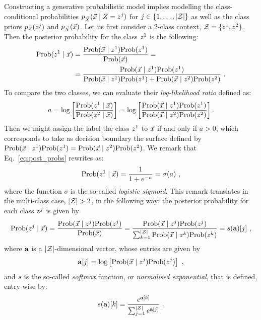 Constructing a generative probabilistic model implies modelling the class-conditional probabilities $\pdf_{\vaLeakVec}(\given{\vLeakVec}{\sensRandVar = \sensVar^j})$ for $j\in \{1,\dots,\lvert\mathcal{Z}\rvert\}$ as well as the class priors $p_{Z}(z^j)$ and $p_{\vec{X}}(\vec{x})$. Let us first consider a 2-class context, \ie $\mathcal{Z} = \{z^1, z^2\}$. Then the posterior probability for the class $z^1$ is the following:
\begin{align}\label{eq:post_probs}
\prob(\given{\sensVar^1}{\vLeakVec}) &= \frac{\prob(\given{\vLeakVec}{\sensVar^1})\prob(\sensVar^1)}{\prob(\vLeakVec)}=\\
&=\frac{\prob(\given{\vLeakVec}{\sensVar^1})\prob(\sensVar^1)}{\prob(\given{\vLeakVec}{\sensVar^1})\prob(\sensVar^1) + \prob(\given{\vLeakVec}{\sensVar^2})\prob(\sensVar^2)}\mbox{ .}
\end{align}
To compare the two classes, we can evaluate their \emph{log-likelihood ratio} defined as:
\begin{equation}\label{eq:log-ratio}
a = \log\left[\frac{\prob(\given{\sensVar^1}{\vLeakVec})}{\prob(\given{\sensVar^2}{\vLeakVec})}\right] =  \log\left[\frac{\prob(\given{\vLeakVec}{\sensVar^1})\prob(\sensVar^1)}{\prob(\given{\vLeakVec}{\sensVar^2})\prob(\sensVar^2)}\right].
\end{equation}
Then we might assign the label the class $z^1$ to $\vec{x}$  if and only if $a>0$, which corresponds to take as decision boundary the surface defined by $\prob(\given{\vLeakVec}{\sensVar^1})\prob(\sensVar^1) = \prob(\given{\vLeakVec}{\sensVar^2})\prob(\sensVar^2)$.
We remark that Eq.~\eqref{eq:post_probs} rewrites as:
\begin{equation}\label{eq:post_probs_sigmoid}
\prob(\given{\sensVar^1}{\vLeakVec}) = \frac{1}{1+e^{-a}} = \sigma(a)\mbox{ ,}
\end{equation}
where the function $\sigma$ is the so-called \emph{logistic sigmoid}. This remark translates in the multi-class case, \ie $\lvert\mathcal{Z}\rvert >2$, in the following way: the posterior probability for each class $z^j$ is given by
\begin{equation}\label{eq:post_probs_multi-class}
\prob(\given{\sensVar^j}{\vLeakVec})  = \frac{\prob(\given{\vLeakVec}{\sensVar^j})\prob(\sensVar^j)}{\prob(\vLeakVec)} = \frac{\prob(\given{\vLeakVec}{\sensVar^j})\prob(\sensVar^j)}{\sum_{k=1}^{\nbClasses}\prob(\given{\vLeakVec}{\sensVar^k})\prob(\sensVar^k )} = \softmax (\aaa)[j]\mbox{ ,}
\end{equation}
where $\textbf{a}$ is a $\lvert\mathcal{Z}\rvert$-dimensional vector, whose entries are given by
\begin{equation}
\aaa[j] = \log\left[ \prob(\given{\vLeakVec}{\sensVar^j})\prob(\sensVar^j) \right] \mbox{ ,}
\end{equation}
and $s$ is the so-called \emph{softmax} function, or \emph{normalised exponential}, that is defined, entry-wise by:
\begin{equation}\label{eq:softmax}
s(\textbf{a})[k] = \frac{e^{\textbf{a}[k]}}{\sum_{j=1}^{\lvert\mathcal{Z}\rvert}e^{\textbf{a}[j]}}\mbox{ .}
\end{equation}

